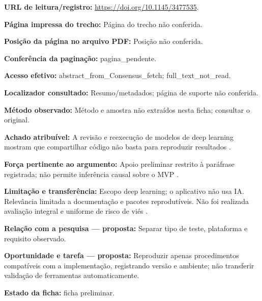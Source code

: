 \noindent\textbf{URL de leitura/registro:} \url{https://doi.org/10.1145/3477535}.\par\medskip

\noindent\textbf{Página impressa do trecho:} Página do trecho não conferida.\par\medskip

\noindent\textbf{Posição da página no arquivo PDF:} Posição não conferida.\par\medskip

\noindent\textbf{Conferência da paginação:} pagina\_pendente.\par\medskip

\noindent\textbf{Acesso efetivo:} abstract\_from\_Consensus\_fetch; full\_text\_not\_read.\par\medskip

\noindent\textbf{Localizador consultado:} Resumo/metadados; página de suporte não conferida.\par\medskip

\noindent\textbf{Método observado:} Método e amostra não extraídos nesta ficha; consultar o original.\par\medskip

\noindent\textbf{Achado atribuível:} A revisão e reexecução de modelos de deep learning mostram que compartilhar código não basta para reproduzir resultados \citep{eng10}.\par\medskip

\noindent\textbf{Força pertinente ao argumento:} Apoio preliminar restrito à paráfrase registrada; não permite inferência causal sobre o MVP \citep{eng10}.\par\medskip

\noindent\textbf{Limitação e transferência:} Escopo deep learning; o aplicativo não usa IA. Relevância limitada a documentação e pacotes reprodutíveis. Não foi realizada avaliação integral e uniforme de risco de viés \citep{eng10}.\par\medskip

\noindent\textbf{Relação com a pesquisa — proposta:} Separar tipo de teste, plataforma e requisito observado.\par\medskip

\noindent\textbf{Oportunidade e tarefa — proposta:} Reproduzir apenas procedimentos compatíveis com a implementação, registrando versão e ambiente; não transferir validação de ferramentas automaticamente.\par\medskip

\noindent\textbf{Estado da ficha:} ficha preliminar.\par\medskip

